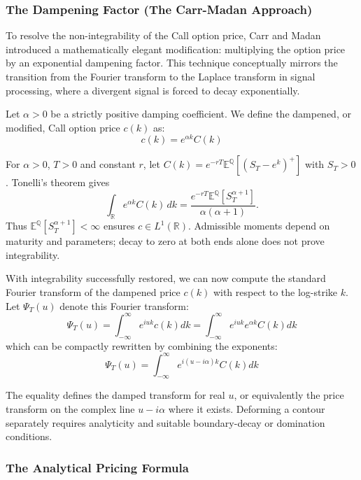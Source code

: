 \subsubsection{The Dampening Factor (The Carr-Madan Approach)}

To resolve the non-integrability of the Call option price, Carr and Madan~\cite{CarrMadan1999} introduced a mathematically elegant modification: multiplying the option price by an exponential dampening factor. This technique conceptually mirrors the transition from the Fourier transform to the Laplace transform in signal processing, where a divergent signal is forced to decay exponentially.

Let $\alpha > 0$ be a strictly positive damping coefficient. We define the dampened, or modified, Call option price $c(k)$ as:
\begin{equation}
    c(k) = e^{\alpha k} C(k)
\end{equation}



For $\alpha>0$, $T>0$ and constant $r$, let
$C(k)=e^{-rT}\mathbb E^{\mathbb Q}[(S_T-e^k)^+]$ with $S_T>0$.
Tonelli's theorem gives
\[
\int_{\mathbb R}e^{\alpha k}C(k)\,dk
=\frac{e^{-rT}\mathbb E^{\mathbb Q}[S_T^{\alpha+1}]}
{\alpha(\alpha+1)}.
\]
Thus $\mathbb E^{\mathbb Q}[S_T^{\alpha+1}]<\infty$ ensures
$c\in L^1(\mathbb R)$. Admissible moments depend on maturity and
parameters; decay to zero at both ends alone does not prove integrability.



With integrability successfully restored, we can now compute the standard Fourier transform of the dampened price $c(k)$ with respect to the log-strike $k$. Let $\Psi_T(u)$ denote this Fourier transform:
\begin{equation}
    \Psi_T(u) = \int_{-\infty}^{\infty} e^{iuk} c(k) dk = \int_{-\infty}^{\infty} e^{iuk} e^{\alpha k} C(k) dk
\end{equation}
which can be compactly rewritten by combining the exponents:
\begin{equation}
    \Psi_T(u) = \int_{-\infty}^{\infty} e^{i(u - i\alpha)k} C(k) dk
\end{equation}

The equality defines the damped transform for real $u$, or equivalently
the price transform on the complex line $u-i\alpha$ where it exists.
Deforming a contour separately requires analyticity and suitable
boundary-decay or domination conditions.
\subsubsection{The Analytical Pricing Formula}


